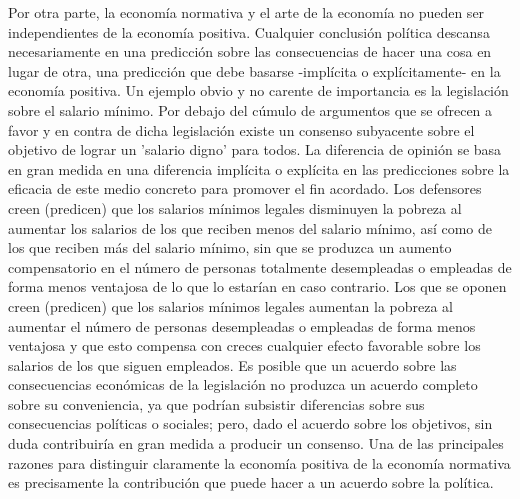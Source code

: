 Por otra parte, la economía normativa y el arte de la economía no pueden ser independientes de la economía positiva. Cualquier conclusión política descansa necesariamente en una predicción sobre las consecuencias de hacer una cosa en lugar de otra, una predicción que debe basarse -implícita o explícitamente- en la economía positiva. Un ejemplo obvio y no carente de importancia es la legislación sobre el salario mínimo. Por debajo del cúmulo de argumentos que se ofrecen a favor y en contra de dicha legislación existe un consenso subyacente sobre el objetivo de lograr un 'salario digno' para todos.  La diferencia de opinión se basa en gran medida en una diferencia implícita o explícita en las predicciones sobre la eficacia de este medio concreto para promover el fin acordado. Los defensores creen (predicen) que los salarios mínimos legales disminuyen la pobreza al aumentar los salarios de los que reciben menos del salario mínimo, así como de los que reciben más del salario mínimo, sin que se produzca un aumento compensatorio en el número de personas totalmente desempleadas o empleadas de forma menos ventajosa de lo que lo estarían en caso contrario. Los que se oponen creen (predicen) que los salarios mínimos legales aumentan la pobreza al aumentar el número de personas desempleadas o empleadas de forma menos ventajosa y que esto compensa con creces cualquier efecto favorable sobre los salarios de los que siguen empleados. Es posible que un acuerdo sobre las consecuencias económicas de la legislación no produzca un acuerdo completo sobre su conveniencia, ya que podrían subsistir diferencias sobre sus consecuencias políticas o sociales; pero, dado el acuerdo sobre los objetivos, sin duda contribuiría en gran medida a producir un consenso. Una de las principales razones para distinguir claramente la economía positiva de la economía normativa es precisamente la contribución que puede hacer a un acuerdo sobre la política.

